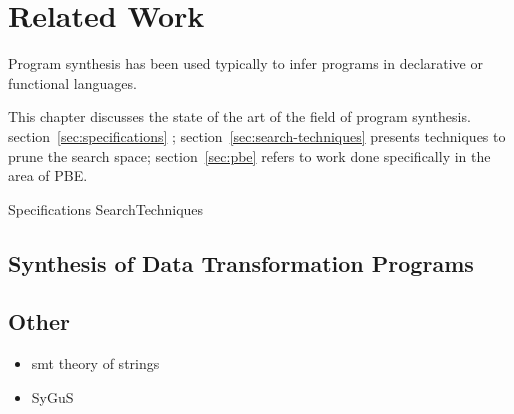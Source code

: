 \chapter{Related Work}
\label{chapter:relatedWork}



Program synthesis has been used typically to infer programs in declarative or
functional languages.

This chapter discusses the state of the art of the field of program synthesis.
section~\ref{sec:specifications} ;
section~\ref{sec:search-techniques} presents techniques to prune the search
space;
section~\ref{sec:pbe} refers to work done specifically in the area of \ac{PBE}.

{Specifications}
{SearchTechniques}


\section{Synthesis of Data Transformation Programs}
\label{sec:data-trans-synth}


\section{Other}
\label{sec:other}

\begin{itemize}
\item smt theory of strings
\item SyGuS
\end{itemize}

